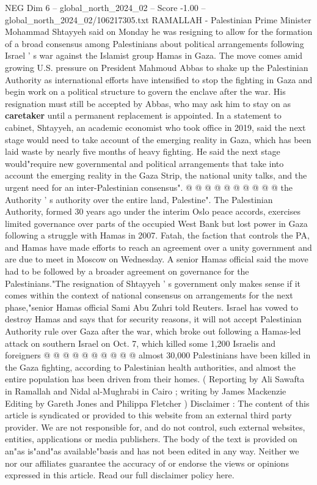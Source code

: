 \begin{textsample}{NEG Dim 6 – global\_north\_2024\_02 – Score -1.00 – global\_north\_2024\_02/106217305.txt}  \label{ex:f6_neg_285}
RAMALLAH - Palestinian Prime Minister Mohammad Shtayyeh said on Monday he was resigning to allow for the formation of a broad consensus among Palestinians about political arrangements following Israel ' s war against the Islamist group Hamas in Gaza.
The move comes amid growing U.S. pressure on President Mahmoud Abbas to shake up the Palestinian Authority as international efforts have intensified to stop the fighting in Gaza and begin work on a political structure to govern the enclave after the war.
His resignation must still be accepted by Abbas, who may ask him to stay on as \textbf{caretaker} until a permanent replacement is appointed.
In a statement to cabinet, Shtayyeh, an academic economist who took office in 2019, said the next stage would need to take account of the emerging reality in Gaza, which has been laid waste by nearly five months of heavy fighting.
He said the next stage would"require new governmental and political arrangements that take into account the emerging reality in the Gaza Strip, the national unity talks, and the urgent need for an inter-Palestinian consensus". @ @ @ @ @ @ @ @ @ @ the Authority ' s authority over the entire land, Palestine".
The Palestinian Authority, formed 30 years ago under the interim Oslo peace accords, exercises limited governance over parts of the occupied West Bank but lost power in Gaza following a struggle with Hamas in 2007.
Fatah, the faction that controls the PA, and Hamas have made efforts to reach an agreement over a unity government and are due to meet in Moscow on Wednesday.
A senior Hamas official said the move had to be followed by a broader agreement on governance for the Palestinians."The resignation of Shtayyeh ' s government only makes sense if it comes within the context of national consensus on arrangements for the next phase,"senior Hamas official Sami Abu Zuhri told Reuters.
Israel has vowed to destroy Hamas and says that for security reasons, it will not accept Palestinian Authority rule over Gaza after the war, which broke out following a Hamas-led attack on southern Israel on Oct. 7, which killed some 1,200 Israelis and foreigners @ @ @ @ @ @ @ @ @ @ almost 30,000 Palestinians have been killed in the Gaza fighting, according to Palestinian health authorities, and almost the entire population has been driven from their homes. ( Reporting by Ali Sawafta in Ramallah and Nidal al-Mughrabi in Cairo ; writing by James Mackenzie Editing by Gareth Jones and Philippa Fletcher ) Disclaimer : The content of this article is syndicated or provided to this website from an external third party provider.
We are not responsible for, and do not control, such external websites, entities, applications or media publishers.
The body of the text is provided on an"as is"and"as available"basis and has not been edited in any way.
Neither we nor our affiliates guarantee the accuracy of or endorse the views or opinions expressed in this article.
Read our full disclaimer policy here.

\end{textsample}

